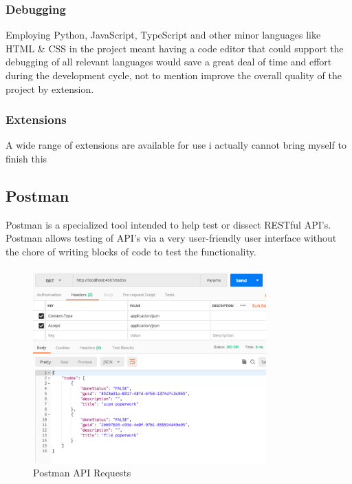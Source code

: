 \subsubsection{Debugging}
Employing Python, JavaScript, TypeScript and other minor languages like HTML \& CSS in the project meant having a code editor that could support the debugging of all relevant languages would save a great deal of time and effort during the development cycle, not to mention improve the overall quality of the project by extension.

\subsubsection{Extensions}
A wide range of extensions are available for use i actually cannot bring myself to finish this

\subsection{Postman}
Postman is a specialized tool intended to help test or dissect RESTful API's. Postman allows testing of API's via a very user-friendly user interface without the chore of writing blocks of code to test the functionality.

\paragraph{}

\begin{figure}[H]
	\caption{Postman API Requests}
	\label{image:postman}
	\centering
	\includegraphics[width=0.8\textwidth]{images/postman.png}
\end{figure}	

